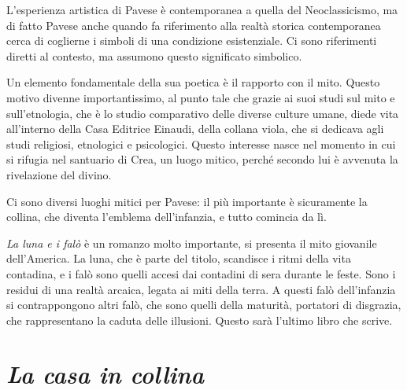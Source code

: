 L'esperienza artistica di Pavese è contemporanea a quella del Neoclassicismo, ma di fatto Pavese anche quando fa riferimento alla realtà storica contemporanea cerca di coglierne i simboli di una condizione esistenziale.
Ci sono riferimenti diretti al contesto, ma assumono questo significato simbolico. 

Un elemento fondamentale della sua poetica è il rapporto con il mito. Questo motivo divenne importantissimo, al punto tale che grazie ai suoi studi sul mito e sull'etnologia, che è lo studio comparativo delle diverse culture umane, diede vita all'interno della Casa Editrice Einaudi, della collana viola, che si dedicava agli studi religiosi, etnologici e psicologici.
Questo interesse nasce nel momento in cui si rifugia nel santuario di Crea, un luogo mitico, perché secondo lui è avvenuta la rivelazione del divino.

Ci sono diversi luoghi mitici per Pavese: il più importante è sicuramente la collina, che diventa l'emblema dell'infanzia, e tutto comincia da lì.

\textit{La luna e i falò} è un romanzo molto importante, si presenta il mito giovanile dell'America.
La luna, che è parte del titolo, scandisce i ritmi della vita contadina, e i falò sono quelli accesi dai contadini di sera durante le feste. Sono i residui di una realtà arcaica, legata ai miti della terra.
A questi falò dell'infanzia si contrappongono altri falò, che sono quelli della maturità, portatori di disgrazia, che rappresentano la caduta delle illusioni.
Questo sarà l'ultimo libro che scrive.

\section{\textit{La casa in collina}}

